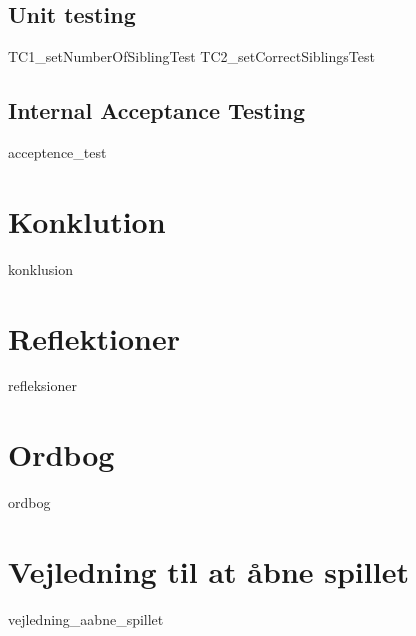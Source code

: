 \documentclass{article}
\begin{document}
{\subsection{Unit testing}
{TC1_setNumberOfSiblingTest}
{TC2_setCorrectSiblingsTest}

\subsection{Internal Acceptance Testing}
{acceptence_test}

\section{Konklution}
{konklusion}
\section{Reflektioner}
{refleksioner}
\newpage
\section*{Ordbog}

{ordbog}

\newpage
\cleardoublepage
\printbibliography[heading=bibintoc]
}

\newpage
\section*{Vejledning til at åbne spillet}

{vejledning_aabne_spillet}
\end{document}
